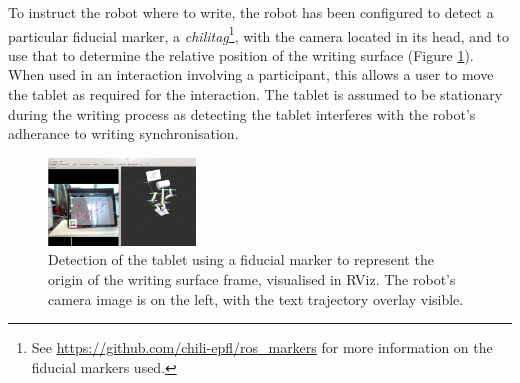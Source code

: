 \documentclass{sig-alternate}
\begin{document}





To instruct the robot where to write, the robot has been configured to detect a
particular fiducial marker, a \emph{chilitag}\footnote{See
\url{https://github.com/chili-epfl/ros_markers} for more information on the
fiducial markers used.}, with the camera located in its head, and to use that to
determine the relative position of the writing surface (Figure
\ref{fig:tabletDetection}). When used in an interaction involving a participant, this
allows a user to move the tablet as required for the interaction. The tablet is 
assumed to be stationary during the writing process as detecting the tablet interferes
with the robot's adherance to writing synchronisation.

\begin{figure}[htpb]
    \centering
    \includegraphics[width=0.35\textwidth]{figures/chilitagDetection_cameraOverlay.png}
    \caption{\label{fig:tabletDetection}Detection of the tablet using a fiducial
    marker to represent the origin of the writing surface frame, visualised in RViz. The robot's
    camera image is on the left, with the text trajectory overlay visible.}

\end{figure}
\end{document}

